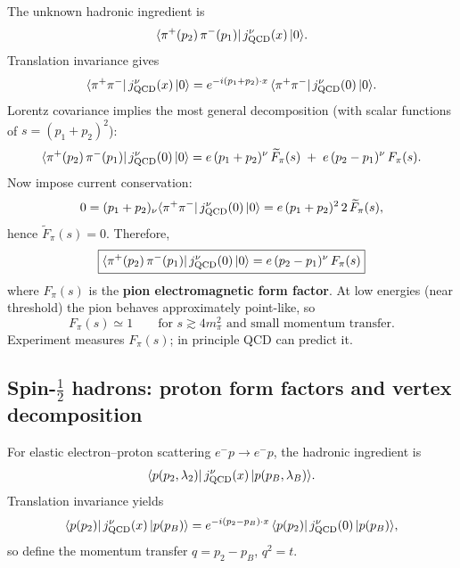The unknown hadronic ingredient is
\begin{equation}
\langle \pi^+(p_2)\,\pi^-(p_1)|\,j^\nu_{\rm QCD}(x)\,|0\rangle.
\end{equation}
Translation invariance gives
\begin{equation}
\langle \pi^+\pi^-|\,j^\nu_{\rm QCD}(x)\,|0\rangle
= e^{-i(p_1+p_2)\cdot x}\,
\langle \pi^+\pi^-|\,j^\nu_{\rm QCD}(0)\,|0\rangle .
\end{equation}
Lorentz covariance implies the most general decomposition (with scalar functions of $s=(p_1+p_2)^2$):
\begin{equation}
\langle \pi^+(p_2)\,\pi^-(p_1)|\,j^\nu_{\rm QCD}(0)\,|0\rangle
= e\,(p_1+p_2)^\nu \,\widetilde F_\pi(s)\;+\;e\,(p_2-p_1)^\nu\,F_\pi(s).
\end{equation}
Now impose current conservation:
\begin{equation}
0=(p_1+p_2)_\nu \langle \pi^+\pi^-|\,j^\nu_{\rm QCD}(0)\,|0\rangle
= e\,(p_1+p_2)^2\,2\,\widetilde F_\pi(s),
\end{equation}
hence $\widetilde F_\pi(s)=0$. Therefore,
\begin{equation}
\boxed{
\langle \pi^+(p_2)\,\pi^-(p_1)|\,j^\nu_{\rm QCD}(0)\,|0\rangle
= e\,(p_2-p_1)^\nu\,F_\pi(s)
}
\end{equation}
where $F_\pi(s)$ is the \textbf{pion electromagnetic form factor}. At low energies
(near threshold) the pion behaves approximately point-like, so
\begin{equation}
F_\pi(s)\simeq 1 \qquad \text{for } s \gtrsim 4m_\pi^2 \text{ and small momentum transfer}.
\end{equation}
Experiment measures $F_\pi(s)$; in principle QCD can predict it.

\subsection{Spin-$\tfrac12$ hadrons: proton form factors and vertex decomposition}
For elastic electron--proton scattering $e^-p\to e^-p$, the hadronic ingredient is
\begin{equation}
\langle p(p_2,\lambda_2)|\,j^\nu_{\rm QCD}(x)\,|p(p_B,\lambda_B)\rangle .
\end{equation}
Translation invariance yields
\begin{equation}
\langle p(p_2)|\,j^\nu_{\rm QCD}(x)\,|p(p_B)\rangle
= e^{-i(p_2-p_B)\cdot x}\,
\langle p(p_2)|\,j^\nu_{\rm QCD}(0)\,|p(p_B)\rangle ,
\end{equation}
so define the momentum transfer $q=p_2-p_B$, $q^2=t$.

